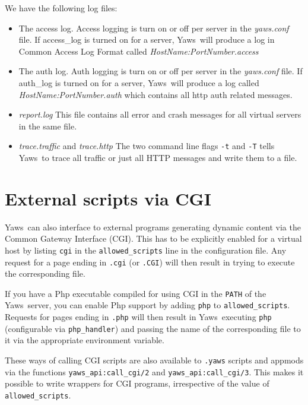 \documentclass[11pt,oneside,english]{book}
\newcommand{\Yaws}            %
        {{\sc Yaws}}
\begin{document}
We have the following log files:
\begin{itemize}
\item The access log. Access logging is turn on or off per server
in the \textit{yaws.conf} file. If access\_log is turned on for a server,
\Yaws\  will produce a log in Common Access Log Format called
\textit{HostName:PortNumber.access}

\item The auth log. Auth logging is turn on or off per server in the
  \textit{yaws.conf} file. If auth\_log is turned on for a server, \Yaws\ will
  produce a log called \textit{HostName:PortNumber.auth} which contains all http
  auth related messages.

\item \textit{report.log} This file contains all error and crash
messages for all virtual servers in the same file.

\item \textit{trace.traffic} and \textit{trace.http} The two
command line flags \verb+-t+ and \verb+-T+ tells \Yaws\  to trace
all traffic or just all HTTP messages and write them to a file.
\end{itemize}


\chapter{External scripts via CGI}

\Yaws\  can also interface to external programs generating dynamic
content via the Common Gateway Interface (CGI).  This has to be
explicitly enabled for a virtual host by listing \verb+cgi+ in the
\verb+allowed_scripts+ line in the configuration file.  Any request
for a page ending in \verb+.cgi+ (or \verb+.CGI+) will then result in
trying to execute the corresponding file.

If you have a Php executable compiled for using CGI in the \verb+PATH+
of the \Yaws\  server, you can enable Php support by adding \verb+php+ to
\verb+allowed_scripts+.  Requests for pages ending in \verb+.php+ will
then result in \Yaws\  executing \verb+php+ (configurable via
\verb+php_handler+) and passing the name of the corresponding file to
it via the appropriate environment variable.

These ways of calling CGI scripts are also available to \verb+.yaws+
scripts and appmods via the functions \verb+yaws_api:call_cgi/2+ and
\verb+yaws_api:call_cgi/3+.  This makes it possible to write wrappers
for CGI programs, irrespective of the value of \verb+allowed_scripts+.
\end{document}
